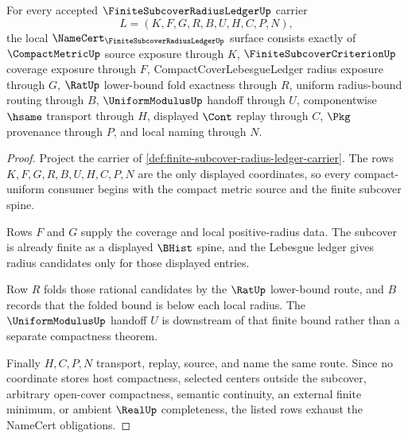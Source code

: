 \begin{theorem}
\label{thm:finite-subcover-radius-ledger-namecert-obligations}
For every accepted $\FiniteSubcoverRadiusLedgerUp$ carrier
$$
L=(K,F,G,R,B,U,H,C,P,N),
$$
the local $\NameCert_{\FiniteSubcoverRadiusLedgerUp}$ surface consists exactly of $\CompactMetricUp$ source exposure through $K$, $\FiniteSubcoverCriterionUp$ coverage exposure through $F$, CompactCoverLebesgueLedger radius exposure through $G$, $\RatUp$ lower-bound fold exactness through $R$, uniform radius-bound routing through $B$, $\UniformModulusUp$ handoff through $U$, componentwise $\hsame$ transport through $H$, displayed $\Cont$ replay through $C$, $\Pkg$ provenance through $P$, and local naming through $N$.
\end{theorem}
\begin{proof}
Project the carrier of \autoref{def:finite-subcover-radius-ledger-carrier}. The rows $K,F,G,R,B,U,H,C,P,N$ are the only displayed coordinates, so every compact-uniform consumer begins with the compact metric source and the finite subcover spine.

Rows $F$ and $G$ supply the coverage and local positive-radius data. The subcover is already finite as a displayed $\BHist$ spine, and the Lebesgue ledger gives radius candidates only for those displayed entries.

Row $R$ folds those rational candidates by the $\RatUp$ lower-bound route, and $B$ records that the folded bound is below each local radius. The $\UniformModulusUp$ handoff $U$ is downstream of that finite bound rather than a separate compactness theorem.

Finally $H,C,P,N$ transport, replay, source, and name the same route. Since no coordinate stores host compactness, selected centers outside the subcover, arbitrary open-cover compactness, semantic continuity, an external finite minimum, or ambient $\RealUp$ completeness, the listed rows exhaust the NameCert obligations.
\end{proof}


